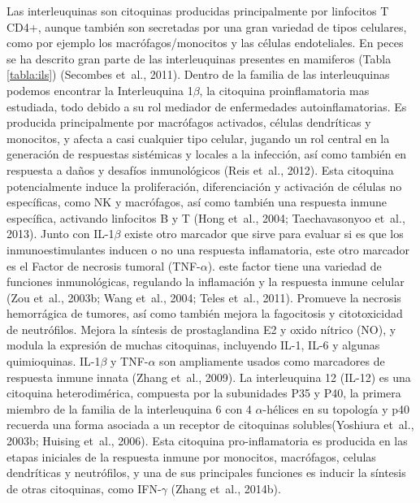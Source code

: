 \documentclass[12pt,letterpaper,oneside]{scrbook}
\begin{document}
Las interleuquinas son citoquinas producidas principalmente por
linfocitos T CD4+, aunque también son secretadas por una gran variedad
de tipos celulares, como por ejemplo los macrófagos/monocitos y las
células endoteliales. En peces se ha descrito gran parte de las
interleuquinas presentes en mamiferos (Tabla \ref{tabla:ils}) (Secombes
et~al., 2011). Dentro de la familia de las interleuquinas podemos
encontrar la Interleuquina 1\(\beta\), la citoquina proinflamatoria mas
estudiada, todo debido a su rol mediador de enfermedades
autoinflamatorias. Es producida principalmente por macrófagos activados,
células dendríticas y monocitos, y afecta a casi cualquier tipo celular,
jugando un rol central en la generación de respuestas sistémicas y
locales a la infección, así como también en respuesta a daños y desafíos
inmunológicos (Reis et~al., 2012). Esta citoquina potencialmente induce
la proliferación, diferenciación y activación de células no específicas,
como NK y macrófagos, así como también una respuesta inmune específica,
activando linfocitos B y T (Hong et~al., 2004; Taechavasonyoo et~al.,
2013). Junto con IL-1\(\beta\) existe otro marcador que sirve para
evaluar si es que los inmunoestimulantes inducen o no una respuesta
inflamatoria, este otro marcador es el Factor de necrosis tumoral
(TNF-\(\alpha\)). este factor tiene una variedad de funciones
inmunológicas, regulando la inflamación y la respuesta inmune celular
(Zou et~al., 2003b; Wang et~al., 2004; Teles et~al., 2011). Promueve la
necrosis hemorrágica de tumores, así como también mejora la fagocitosis
y citotoxicidad de neutrófilos. Mejora la síntesis de prostaglandina E2
y oxido nítrico (NO), y modula la expresión de muchas citoquinas,
incluyendo IL-1, IL-6 y algunas quimioquinas. IL-1\(\beta\) y
TNF-\(\alpha\) son ampliamente usados como marcadores de respuesta
inmune innata (Zhang et~al., 2009). La interleuquina 12 (IL-12) es una
citoquina heterodimérica, compuesta por la subunidades P35 y P40, la
primera miembro de la familia de la interleuquina 6 con 4
\(\alpha\)-hélices en su topología y p40 recuerda una forma asociada a
un receptor de citoquinas solubles(Yoshiura et~al., 2003b; Huising
et~al., 2006). Esta citoquina pro-inflamatoria es producida en las
etapas iniciales de la respuesta inmune por monocitos, macrófagos,
celulas dendríticas y neutrófilos, y una de sus principales funciones es
inducir la síntesis de otras citoquinas, como IFN-\(\gamma\) (Zhang
et~al., 2014b).
\end{document}
